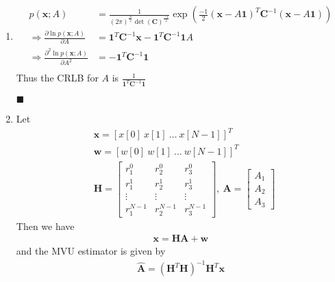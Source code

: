 \documentclass[a4paper,12pt]{article}
\begin{document}
\begin{enumerate}
        \item
            \begin{align*}
                p(\mathbf x;A) &=\frac{1}{(2\pi)^\frac{N}{2}\det{(\mathbf C)}^{\frac{-1}{2}}}\exp{\left(\frac{-1}{2}(\mathbf x-A\mathbf 1)^T\mathbf C^{-1}(\mathbf x-A\mathbf 1)\right)}\\
                \Longrightarrow\frac{\partial\ln{p(\mathbf x;A)}}{\partial A} &= \mathbf 1^T\mathbf C^{-1}\mathbf x-\mathbf 1^T\mathbf C^{-1}\mathbf 1A\\
                \Longrightarrow\frac{\partial^2\ln{p(\mathbf x;A)}}{\partial A^2} &=-\mathbf 1^T\mathbf C^{-1}\mathbf 1\\
            \end{align*}
            Thus the CRLB for $A$ is $\frac{1}{\mathbf 1^T\mathbf C^{-1}\mathbf 1}$
            \begin{flushright}
                $\blacksquare$
            \end{flushright}
        \item
            Let
            \begin{align*}
                &\mathbf x=[x[0]\ x[1]\ \dots\ x[N-1]]^T\\
                &\mathbf w=[w[0]\ w[1]\ \dots\ w[N-1]]^T\\
                &\mathbf H=\begin{bmatrix}
                r_1^0       &   r_2^0       &   r_3^0\\
                r_1^1       &   r_2^1       &   r_3^1\\
                \vdots      &   \vdots      &   \vdots\\
                r_1^{N-1}   &   r_2^{N-1}   &   r_3^{N-1}\end{bmatrix},\ \mathbf A=\begin{bmatrix}A_1\\A_2\\A_3\end{bmatrix}
            \end{align*}
            Then we have
            \begin{align*}
                \mathbf x =\mathbf H\mathbf A+\mathbf w
            \end{align*}
            and the MVU estimator is given by
            \begin{align*}
                \hat{\mathbf A}=(\mathbf H^T\mathbf H)^{-1}\mathbf H^T\mathbf x

\end{align*}
\end{enumerate}
\end{document}
